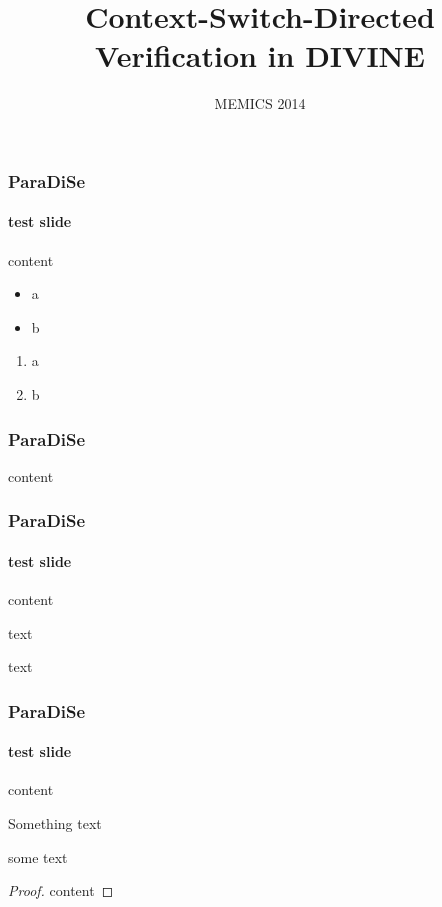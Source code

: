 \documentclass{paradise-slide}
\title{Context-Switch-Directed Verification in DIVINE}
\subtitle{MEMICS 2014}
\author[Vladimír Štill et. al.]{%
    \makebox[0.3\textwidth][c]{\textbf{Vladimír Štill}}%
    \makebox[0.3\textwidth][c]{Petr Ročkai}%
    \makebox[0.3\textwidth][c]{Jiří Barnat}%
}
\begin{document}
\maketitle

\begin{frame}
    \frametitle{ParaDiSe}
    \framesubtitle{test slide}
    content
    \begin{itemize}
        \item a
        \item b
    \end{itemize}

    \begin{enumerate}
        \item a
        \item b
    \end{enumerate}
\end{frame}

\begin{frame}
    \frametitle{ParaDiSe}
    content
\end{frame}

\begin{frame}
    \frametitle{ParaDiSe}
    \framesubtitle{test slide}
    content

    \begin{example}
        text
    \end{example}

    \begin{definition}
        text
    \end{definition}
\end{frame}

\begin{frame}
    \frametitle{ParaDiSe}
    \framesubtitle{test slide}
    content
    \begin{block}{Something}
        text
    \end{block}

    some text

    \begin{proof}
        content
    \end{proof}
\end{frame}
\end{document}
